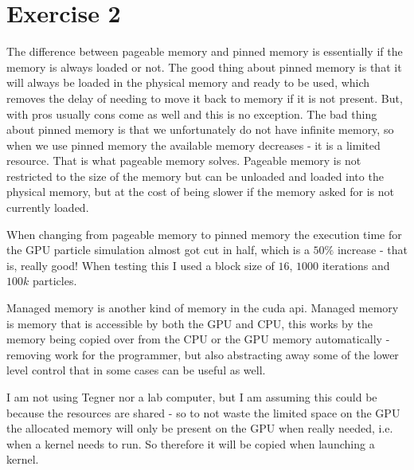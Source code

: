 \documentclass[a4paper, 12pt]{article}
\begin{document}



\section{Exercise 2}
The difference between pageable memory and pinned memory is essentially if the memory is always loaded or not. The good thing about pinned memory is that it will always be loaded in the physical memory and ready to be used, which removes the delay of needing to move it back to memory if it is not present. But, with pros usually cons come as well and this is no exception. The bad thing about pinned memory is that we unfortunately do not have infinite memory, so when we use pinned memory the available memory decreases - it is a limited resource. That is what pageable memory solves. Pageable memory is not restricted to the size of the memory but can be unloaded and loaded into the physical memory, but at the cost of being slower if the memory asked for is not currently loaded.

When changing from pageable memory to pinned memory the execution time for the GPU particle simulation almost got cut in half, which is a $50\%$ increase - that is, really good! When testing this I used a block size of $16$, $1000$ iterations and $100k$ particles.

Managed memory is another kind of memory in the cuda api. Managed memory is memory that is accessible by both the GPU and CPU, this works by the memory being copied over from the CPU or the GPU memory automatically - removing work for the programmer, but also abstracting away some of the lower level control that in some cases can be useful as well.

I am not using Tegner nor a lab computer, but I am assuming this could be because the resources are shared - so to not waste the limited space on the GPU the allocated memory will only be present on the GPU when really needed, i.e. when a kernel needs to run. So therefore it will be copied when launching a kernel.
\end{document}
